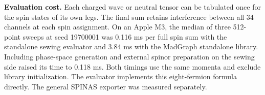 \documentclass[11pt]{article}
\begin{document}
\textbf{Evaluation cost.} Each charged wave or neutral tensor can be tabulated
once for the spin states of its own legs. The final sum retains interference
between all 34 channels at each spin assignment. On an Apple M3, the median
of three 512-point sweeps at seed 19700001 was 0.116 ms per full spin sum
with the standalone sewing evaluator and 3.84 ms with the MadGraph standalone
library. Including phase-space generation and external spinor preparation on
the sewing side raised its time to 0.118 ms. Both timings use the same momenta
and exclude library initialization. The evaluator implements this eight-fermion
formula directly. The general SPINAS exporter was measured separately.
\end{document}
